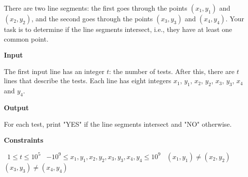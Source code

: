 There are two line segments: the first goes through the points $(x_1,y_1)$ and $(x_2,y_2)$, and the second goes through the points $(x_3,y_3)$ and $(x_4,y_4)$.
Your task is to determine if the line segments intersect, i.e., they have at least one common point.

\vspace{0.3cm}\noindent\textbf{Input}

The first input line has an integer $t$: the number of tests.
After this, there are $t$ lines that describe the tests. Each line has eight integers $x_1$, $y_1$, $x_2$, $y_2$, $x_3$, $y_3$, $x_4$ and $y_4$.

\vspace{0.3cm}\noindent\textbf{Output}

For each test, print "YES" if the line segments intersect and "NO" otherwise.

\vspace{0.3cm}\noindent\textbf{Constraints}

\textbullet\ $1 \le t \le 10^5$
\textbullet\ $-10^9 \le x_1, y_1, x_2, y_2, x_3, y_3, x_4, y_4 \le 10^9$
\textbullet\ $(x_1,y_1) \neq (x_2,y_2)$
\textbullet\ $(x_3,y_3) \neq (x_4,y_4)$